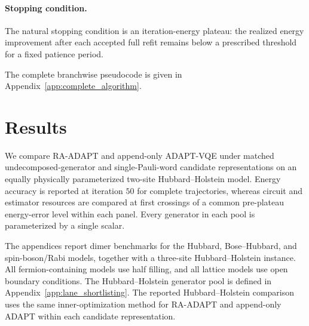 \documentclass[
  reprint,
  amsmath,
  amssymb,
  aps,
  pra,
  nofootinbib,
  superscriptaddress,
  floatfix
]{revtex4-2}
\begin{document}
\paragraph*{Stopping condition.}
The natural stopping condition is an iteration-energy plateau: the realized
energy improvement after each accepted full refit remains below a prescribed
threshold for a fixed patience period.

The complete branchwise pseudocode is given in
Appendix~\ref{app:complete_algorithm}.



\section{Results}
\label{sec:results}
\label{sec:benchmarks}

We compare RA-ADAPT and append-only ADAPT-VQE under matched
undecomposed-generator and single-Pauli-word candidate representations on an
equally physically parameterized two-site Hubbard--Holstein model. Energy
accuracy is reported at iteration \(50\) for complete trajectories, whereas
circuit and estimator resources are compared at first crossings of a common
pre-plateau energy-error level within each panel. Every generator in each pool
is parameterized by a single scalar.

The appendices report dimer benchmarks for the Hubbard, Bose--Hubbard, and spin-boson/Rabi models, together with a three-site Hubbard--Holstein instance. All fermion-containing models use half filling, and all lattice models use open boundary conditions. The Hubbard--Holstein generator pool is defined in Appendix~\ref{app:lane_shortlisting}. The reported Hubbard--Holstein comparison uses the same inner-optimization method for RA-ADAPT and append-only ADAPT within each candidate representation.
\end{document}
